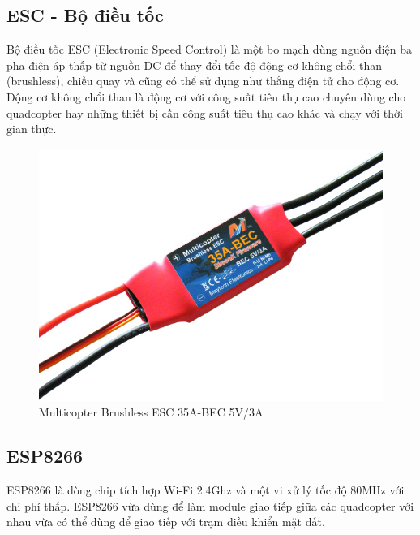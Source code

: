     \subsection{ESC - Bộ điều tốc}
    Bộ điều tốc ESC (Electronic Speed Control) là một bo mạch dùng nguồn điện ba pha điện áp thấp từ nguồn DC để thay đổi tốc độ động cơ không chổi than (brushless), chiều quay và cũng có thể sử dụng như thắng điện tử cho động cơ. Động cơ không chổi than là động cơ với công suất tiêu thụ cao chuyên dùng cho quadcopter hay những thiết bị cần công suất tiêu thụ cao khác và chạy với thời gian thực. 
    
    \begin{figure}[h!]
    	\begin{center}
    		\includegraphics[scale=0.4]{images/esc.jpg}
    		\caption{Multicopter Brushless ESC 35A-BEC 5V/3A}
    	\end{center}
    \end{figure}
    
    \subsection{ESP8266}
    ESP8266 là dòng chip tích hợp Wi-Fi 2.4Ghz và một vi xử lý tốc độ 80MHz với chi phí thấp. ESP8266 vừa dùng để làm module giao tiếp giữa các quadcopter với nhau vừa có thể dùng để giao tiếp với trạm điều khiển mặt đất.


